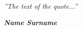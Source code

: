 \begin{dedication} 

{\Huge \it ''The text of the quote...''} \par 
\bigskip
\bigskip
\begin{flushright}
{\Huge \textbf{\textit{Name Surname}} }\par
\end{flushright}

\end{dedication}
